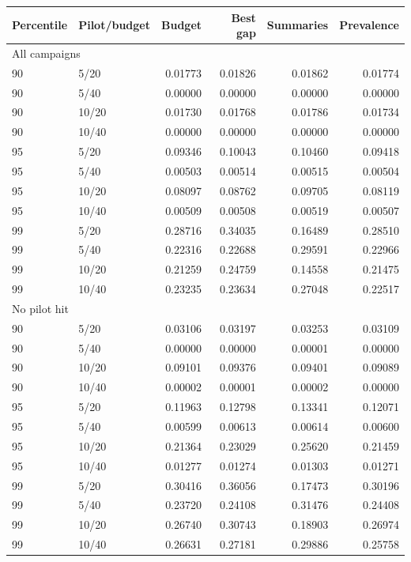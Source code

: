 \begin{tabular}{llrrrr}
\toprule
Percentile & Pilot/budget & Budget & Best gap & Summaries & Prevalence\\
\midrule
\multicolumn{6}{l}{All campaigns}\\
90 & 5/20 & 0.01773 & 0.01826 & 0.01862 & 0.01774\\
90 & 5/40 & 0.00000 & 0.00000 & 0.00000 & 0.00000\\
90 & 10/20 & 0.01730 & 0.01768 & 0.01786 & 0.01734\\
90 & 10/40 & 0.00000 & 0.00000 & 0.00000 & 0.00000\\
95 & 5/20 & 0.09346 & 0.10043 & 0.10460 & 0.09418\\
95 & 5/40 & 0.00503 & 0.00514 & 0.00515 & 0.00504\\
95 & 10/20 & 0.08097 & 0.08762 & 0.09705 & 0.08119\\
95 & 10/40 & 0.00509 & 0.00508 & 0.00519 & 0.00507\\
99 & 5/20 & 0.28716 & 0.34035 & 0.16489 & 0.28510\\
99 & 5/40 & 0.22316 & 0.22688 & 0.29591 & 0.22966\\
99 & 10/20 & 0.21259 & 0.24759 & 0.14558 & 0.21475\\
99 & 10/40 & 0.23235 & 0.23634 & 0.27048 & 0.22517\\
\multicolumn{6}{l}{No pilot hit}\\
90 & 5/20 & 0.03106 & 0.03197 & 0.03253 & 0.03109\\
90 & 5/40 & 0.00000 & 0.00000 & 0.00001 & 0.00000\\
90 & 10/20 & 0.09101 & 0.09376 & 0.09401 & 0.09089\\
90 & 10/40 & 0.00002 & 0.00001 & 0.00002 & 0.00000\\
95 & 5/20 & 0.11963 & 0.12798 & 0.13341 & 0.12071\\
95 & 5/40 & 0.00599 & 0.00613 & 0.00614 & 0.00600\\
95 & 10/20 & 0.21364 & 0.23029 & 0.25620 & 0.21459\\
95 & 10/40 & 0.01277 & 0.01274 & 0.01303 & 0.01271\\
99 & 5/20 & 0.30416 & 0.36056 & 0.17473 & 0.30196\\
99 & 5/40 & 0.23720 & 0.24108 & 0.31476 & 0.24408\\
99 & 10/20 & 0.26740 & 0.30743 & 0.18903 & 0.26974\\
99 & 10/40 & 0.26631 & 0.27181 & 0.29886 & 0.25758\\
\bottomrule
\end{tabular}
